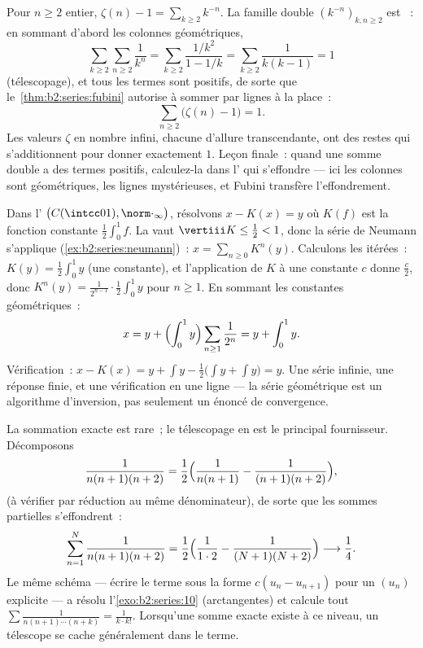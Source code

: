 \begin{example}[Une évaluation par Fubini~: $\sum_n (\zeta(n) - 1) = 1$]\label{ex:b2:series:zetasum}
Pour $n \geq 2$ entier, $\zeta(n) - 1 = \sum_{k \geq 2} k^{-n}$. La
famille double $(k^{-n})_{k, n \geq 2}$ est ~: en sommant
d'abord les colonnes géométriques,
\[
\sum_{k\geq2}\sum_{n\geq2} \frac{1}{k^n}
= \sum_{k\geq2} \frac{1/k^2}{1 - 1/k}
= \sum_{k\geq2} \frac{1}{k(k-1)} = 1
\]
(télescopage), et tous les termes sont positifs, de sorte que
le~\cref{thm:b2:series:fubini} autorise à sommer par lignes à la
place~:
\[
\sum_{n\geq2}\bigl(\zeta(n) - 1\bigr) = 1 .
\]
Les valeurs $\zeta$ en nombre infini, chacune d'allure transcendante,
ont des restes qui s'additionnent pour donner exactement $1$. Leçon
finale~: quand une somme double a des termes positifs, calculez-la
dans l' qui s'effondre --- ici les colonnes sont géométriques,
les lignes mystérieuses, et Fubini transfère l'effondrement.
\end{example}

\begin{example}\label{ex:b2:series:neumannsolve}
Dans l' $\bigl(C(\intcc01),
\norm\cdot_\infty\bigr)$, résolvons $x - K(x) = y$ où $K(f)$ est la
fonction constante $\frac12\int_0^1 f$. La  vaut
$\vertiii K \leq \frac12 < 1$, donc la série de Neumann s'applique
(\cref{ex:b2:series:neumann})~: $x = \sum_{n\geq0} K^n(y)$. Calculons
les itérées~: $K(y) = \frac12\int_0^1 y$ (une constante), et
l'application de $K$ à une constante $c$ donne $\frac c2$, donc
$K^n(y) = \frac{1}{2^{n-1}}\cdot\frac12\int_0^1 y$ pour $n \geq 1$.
En sommant les constantes géométriques~:
\[
x = y + \Bigl(\int_0^1 y\Bigr)
\sum_{n\geq1}\frac{1}{2^n} = y + \int_0^1 y .
\]
Vérification~: $x - K(x) = y + \int y - \frac12\bigl(\int y + \int
y\bigr) = y$. Une série infinie, une réponse finie, et une
vérification en une ligne --- la série géométrique est un algorithme
d'inversion, pas seulement un énoncé de convergence.
\end{example}

\begin{example}\label{ex:b2:series:telescope}
La sommation exacte est rare~; le télescopage en est le principal
fournisseur. Décomposons
\[
\frac{1}{n(n+1)(n+2)}
= \frac{1}{2}\Bigl(\frac{1}{n(n+1)} -
\frac{1}{(n+1)(n+2)}\Bigr),
\]
(à vérifier par réduction au même dénominateur), de sorte que les
sommes partielles s'effondrent~:
\[
\sum_{n=1}^{N}\frac{1}{n(n+1)(n+2)}
= \frac12\Bigl(\frac{1}{1\cdot2} -
\frac{1}{(N+1)(N+2)}\Bigr)
\longrightarrow \frac14 .
\]
Le même schéma --- écrire le terme sous la forme $c(u_n - u_{n+1})$
pour un $(u_n)$ explicite --- a résolu l'\cref{exo:b2:series:10}
(arctangentes) et calcule tout $\sum\frac{1}{n(n+1)\cdots(n + k)} =
\frac{1}{k\cdot k!}$. Lorsqu'une somme exacte existe à ce niveau, un
télescope se cache généralement dans le terme.
\end{example}

